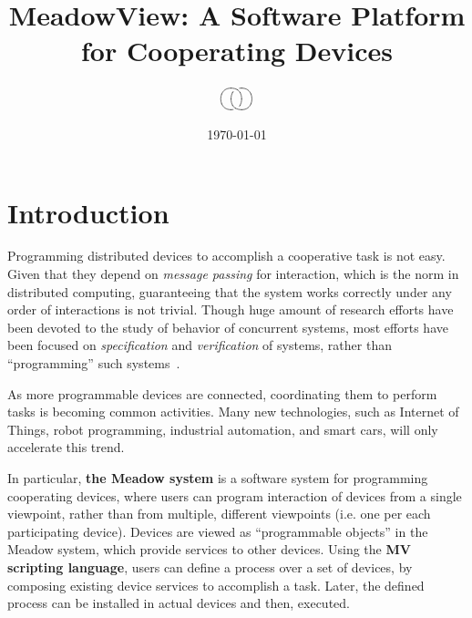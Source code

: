\documentclass{note}
\begin{document}
\small


\title{\large\bf{}\textcolor{blue2}{MeadowView:  A Software Platform for
    Cooperating Devices}}
\author{
$$\xy
\xygraph{!{0;/r0.7pc/:} !{\vover}[u]
  !{\hcap[-2]} [d] !{\vover-} [ruu] !{\hcap[2]}}
\endxy$$
}
\date{\normalsize\today}
\maketitle


\tableofcontents

\section{Introduction}
Programming distributed devices to accomplish a cooperative task is not easy.
Given that they depend on {\em message passing\/} for interaction,
which is the norm in distributed computing, 
guaranteeing that the system works correctly under any order of
interactions is not trivial. Though huge amount of research efforts
have been devoted to the study of behavior of concurrent systems, 
most efforts have been focused on
{\em specification\/} and {\em verification\/} of systems, rather than 
``programming'' such systems~\cite{Hoare85,MP91,Milner89,Murata89}. 

As more programmable devices are connected, coordinating them
to perform tasks is becoming common activities. Many new 
technologies, such as Internet of Things, robot programming, industrial
automation, and smart cars, will only accelerate this trend.

In particular, \textcolor{blue2}{\textbf{the Meadow system}} is a software
system for programming cooperating devices, where users can program
interaction of devices from a single viewpoint, rather than from multiple,
different viewpoints (i.e. one per each participating device).
Devices are viewed as ``programmable objects'' in the Meadow system, 
which provide \textcolor{blue2}{services} to other devices.
Using the \textcolor{blue2}{\textbf{MV scripting language}}, users 
can define a process over a set of devices, by composing existing device
services to accomplish a task.  
Later, the defined process can be installed in actual devices and then,
executed. 
 
\end{document}
